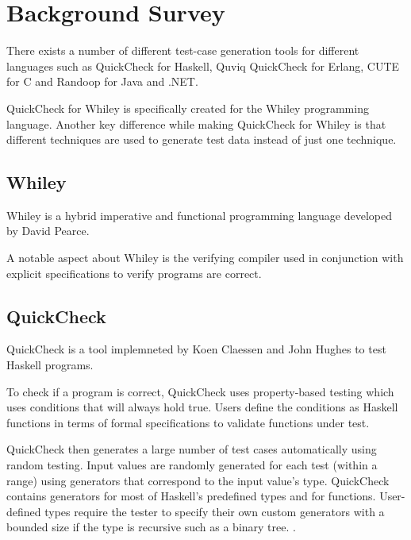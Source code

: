 \chapter{Background Survey}\label{chapter:background}


There exists a number of different test-case generation tools for different languages such as QuickCheck for Haskell, Quviq QuickCheck for Erlang, CUTE for C and Randoop for Java and .NET.


QuickCheck for Whiley is specifically created for the Whiley programming language.
Another key difference while making QuickCheck for Whiley is that different techniques are used to generate test data instead of just one technique.



\section{Whiley}
Whiley is a hybrid imperative and functional programming language developed by David Pearce.

A notable aspect about Whiley is the verifying compiler used in conjunction with explicit specifications to verify programs are correct.



\section{QuickCheck}
QuickCheck is a tool implemneted by Koen Claessen and John Hughes \cite{QClightweight} to test Haskell programs.

To check if a program is correct, QuickCheck uses property-based testing which uses conditions that will always hold true. Users define the conditions as Haskell functions in terms of formal specifications to validate functions under test. 

QuickCheck then generates a large number of test cases automatically using random testing. Input values are randomly generated for each test (within a range) using generators that correspond to the input value's type. QuickCheck contains generators for most of Haskell's predefined types and for functions. User-defined types require the tester to specify their own custom generators with a bounded size if the type is recursive such as a binary tree. \cite{QClightweight}. 

